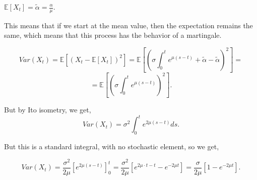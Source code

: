 \documentclass{article}
\begin{document}
$\mathbb{E}[X_t]=\tilde\alpha=\frac{\alpha}{\mu}$.

This means that if we start at the mean value, then the expectation remains the same, which means that this process has the behavior of a martingale.

\[Var(X_t)=\mathbb{E}[(X_t-\mathbb{E}[X_t])^2]=\mathbb{E}[(\sigma\int_0^t{e^{\mu(s-t)}}+\tilde\alpha-\tilde\alpha)^2]=\]\[=\mathbb{E}[(\sigma\int_0^t{e^{\mu(s-t)}})^2].\]

But by Ito isometry, we get,
\[Var(X_t)=\sigma^2\int_0^t{e^{2\mu(s-t)}}ds.\]

But this is a standard integral, with no stochastic element, so we get,

\[Var(X_t)=\frac{\sigma^2}{2\mu}[e^{2\mu(s-t)}]_0^t=\frac{\sigma^2}{2\mu}[e^{2\mu\cdot{t-t}}-e^{-2\mu{t}}]=\frac{\sigma}{2\mu}[1-e^{-2\mu{t}}].\]
\end{document}
